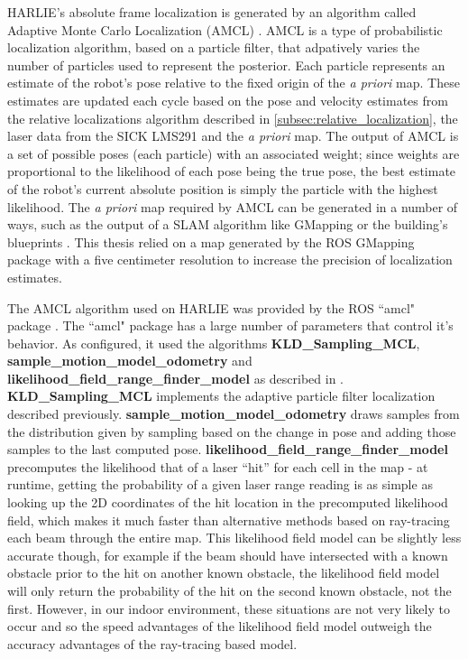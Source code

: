 HARLIE's absolute frame localization is generated by an algorithm called Adaptive Monte Carlo Localization (AMCL) \autocites{Dellaert_1999_533}{Fox01122003}{ProbRobotics}. AMCL is a type of probabilistic localization algorithm, based on a particle filter, that adpatively varies the number of particles used to represent the posterior. Each particle represents an estimate of the robot's pose relative to the fixed origin of the \emph{a priori} map. These estimates are updated each cycle based on the pose and velocity estimates from the relative localizations algorithm described in \autoref{subsec:relative_localization}, the laser data from the SICK LMS291 and the \emph{a priori} map. The output of AMCL is a set of possible poses (each particle) with an associated weight; since weights are proportional to the likelihood of each pose being the true pose, the best estimate of the robot's current absolute position is simply the particle with the highest likelihood. The \emph{a priori} map required by AMCL can be generated in a number of ways, such as the output of a SLAM algorithm like GMapping \autocite{Grisetti07improvedtechniques} or the building's blueprints \autocite{Fish2012}. This thesis relied on a map generated by the ROS GMapping package with a five centimeter resolution to increase the precision of localization estimates.

The AMCL algorithm used on HARLIE was provided by the ROS ``amcl" package \autocite{AMCLWiki}. The ``amcl" package has a large number of parameters that control it's behavior. As configured, it used the algorithms \textbf{KLD\_Sampling\_MCL}, \textbf{sample\_motion\_model\_odometry} and \textbf{likelihood\_field\_range\_finder\_model} as described in \autocite{ProbRobotics}. \textbf{KLD\_Sampling\_MCL} implements the adaptive particle filter localization described previously. \textbf{sample\_motion\_model\_odometry} draws samples from the distribution given by sampling based on the change in pose and adding those samples to the last computed pose. \textbf{likelihood\_field\_range\_finder\_model} precomputes the likelihood that of a laser ``hit'' for each cell in the map - at runtime, getting the probability of a given laser range reading is as simple as looking up the 2D coordinates of the hit location in the precomputed likelihood field, which makes it much faster than alternative methods based on ray-tracing each beam through the entire map. This likelihood field model can be slightly less accurate though, for example if the beam should have intersected with a known obstacle prior to the hit on another known obstacle, the likelihood field model will only return the probability of the hit on the second known obstacle, not the first. However, in our indoor environment, these situations are not very likely to occur and so the speed advantages of the likelihood field model outweigh the accuracy advantages of the ray-tracing based model.

